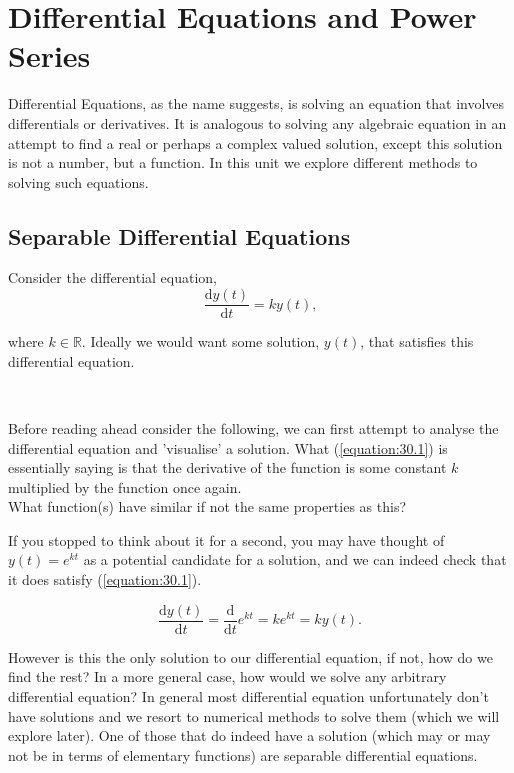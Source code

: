 \documentclass[../../main.tex]{subfiles}
\begin{document}
\chapter{Differential Equations and Power Series}

Differential Equations, as the name suggests, is solving an equation that involves differentials or derivatives. It is analogous to solving any algebraic equation in an attempt to find a real or perhaps a complex valued solution, except this solution is not a number, but a function. In this unit we explore different methods to solving such equations.

\section{Separable Differential Equations}

Consider the differential equation,
\begin{equation}\label{equation:30.1}
\frac{\mathrm{d}y(t)}{\mathrm{d}t}=ky(t)\text{,}
\end{equation}

where $k \in \mathbb{R}$. Ideally we would want some solution, $y(t)$, that satisfies this differential equation.

\begin{thinking}{~}

Before reading ahead consider the following, we can first attempt to analyse the differential equation and 'visualise' a solution. What (\ref{equation:30.1}) is essentially saying is that the derivative of the function is some constant $k$ multiplied by the function once again.
\\
What function(s) have similar if not the same properties as this?
\end{thinking}

If you stopped to think about it for a second, you may have thought of $y(t)=e^{kt}$ as a potential candidate for a solution, and we can indeed check that it does satisfy (\ref{equation:30.1}).

$$\frac{\mathrm{d}y(t)}{\mathrm{d}t}=\frac{\mathrm{d}}{\mathrm{d}t}e^{kt}=ke^{kt}=ky(t)\text{.}$$

However is this the only solution to our differential equation, if not, how do we find the rest? In a more general case, how would we solve any arbitrary differential equation? In general most differential equation unfortunately don't have solutions and we resort to numerical methods to solve them (which we will explore later). One of those that do indeed have a solution (which may or may not be in terms of elementary functions) are separable differential equations.
\end{document}

